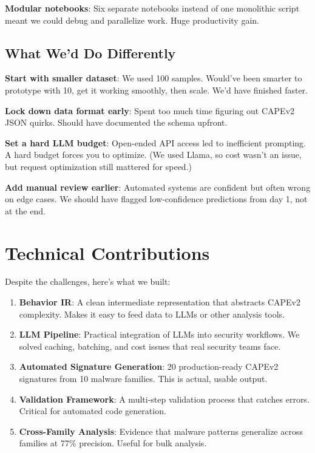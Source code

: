 \documentclass[11pt]{article}
\begin{document}
\textbf{Modular notebooks}: Six separate notebooks instead of one monolithic script meant we could debug and parallelize work. Huge productivity gain.

\subsection{What We'd Do Differently}

\textbf{Start with smaller dataset}: We used 100 samples. Would've been smarter to prototype with 10, get it working smoothly, then scale. We'd have finished faster.

\textbf{Lock down data format early}: Spent too much time figuring out CAPEv2 JSON quirks. Should have documented the schema upfront.

\textbf{Set a hard LLM budget}: Open-ended API access led to inefficient prompting. A hard budget forces you to optimize. (We used Llama, so cost wasn't an issue, but request optimization still mattered for speed.)

\textbf{Add manual review earlier}: Automated systems are confident but often wrong on edge cases. We should have flagged low-confidence predictions from day 1, not at the end.

\section{Technical Contributions}

Despite the challenges, here's what we built:

\begin{enumerate}
    \item \textbf{Behavior IR}: A clean intermediate representation that abstracts CAPEv2 complexity. Makes it easy to feed data to LLMs or other analysis tools.
    
    \item \textbf{LLM Pipeline}: Practical integration of LLMs into security workflows. We solved caching, batching, and cost issues that real security teams face.
    
    \item \textbf{Automated Signature Generation}: 20 production-ready CAPEv2 signatures from 10 malware families. This is actual, usable output.
    
    \item \textbf{Validation Framework}: A multi-step validation process that catches errors. Critical for automated code generation.
    
    \item \textbf{Cross-Family Analysis}: Evidence that malware patterns generalize across families at 77\% precision. Useful for bulk analysis.
\end{enumerate}
\end{document}
